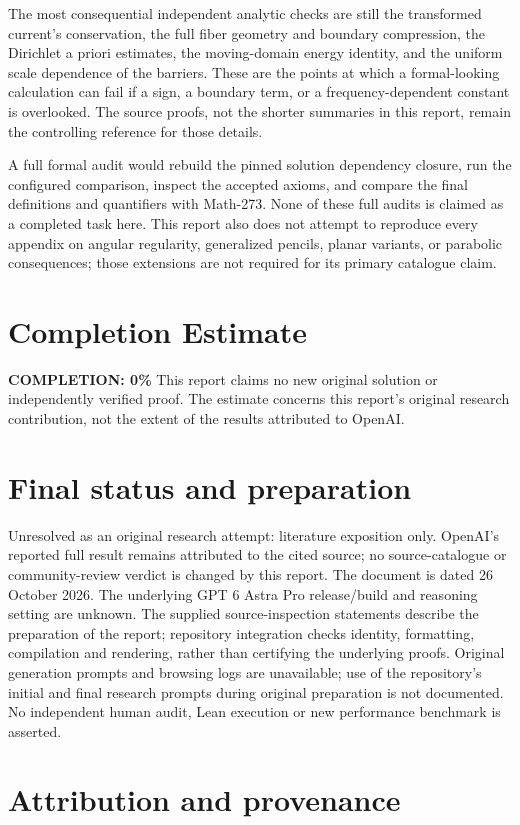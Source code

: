\documentclass[11pt,a4paper]{article}
\numberwithin{equation}{section}
\theoremstyle{definition}
\theoremstyle{remark}
\begin{document}
The most consequential independent analytic checks are still the transformed
current's conservation, the full fiber geometry and boundary compression,
the Dirichlet a priori estimates, the moving-domain energy identity, and the
uniform scale dependence of the barriers. These are the points at which a
formal-looking calculation can fail if a sign, a boundary term, or a
frequency-dependent constant is overlooked. The source proofs, not the shorter
summaries in this report, remain the controlling reference for those details.

A full formal audit would rebuild the pinned solution dependency closure, run
the configured comparison, inspect the accepted axioms, and compare the final
definitions and quantifiers with Math-273. None of these full audits is claimed
as a completed task here. This report also does not attempt to reproduce every
appendix on angular regularity, generalized pencils, planar variants, or
parabolic consequences; those extensions are not required for its primary
catalogue claim.

\section{Completion Estimate}
\noindent\textbf{COMPLETION: 0\%}
This report claims no new original solution or independently verified proof. The estimate concerns this report's original research contribution, not the extent of the results attributed to OpenAI.
\section{Final status and preparation}
Unresolved as an original research attempt: literature exposition only. OpenAI's reported full result remains attributed to the cited source; no source-catalogue or community-review verdict is changed by this report.
The document is dated 26 October 2026. The underlying GPT 6 Astra Pro release/build and reasoning setting are unknown. The supplied source-inspection statements describe the preparation of the report; repository integration checks identity, formatting, compilation and rendering, rather than certifying the underlying proofs. Original generation prompts and browsing logs are unavailable; use of the repository's initial and final research prompts during original preparation is not documented. No independent human audit, Lean execution or new performance benchmark is asserted.


\section{Attribution and provenance}
\end{document}
